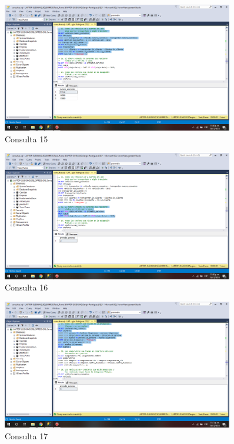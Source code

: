 \documentclass{article}
\begin{document}
\begin{figure}[h]
            \centering
            \includegraphics[width=0.9\textwidth]{img/67.png}
            \caption{Consulta 15}
            \label{fig:my_label15}
        \end{figure}
        
\begin{figure}[h]
            \centering
            \includegraphics[width=0.9\textwidth]{img/68.png}
            \caption{Consulta 16}
            \label{fig:my_label16}
        \end{figure}
        
\begin{figure}[h]
            \centering
            \includegraphics[width=0.9\textwidth]{img/69.png}
            \caption{Consulta 17}
            \label{fig:my_label17}
        \end{figure}
        
\end{document}
